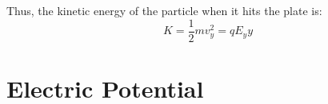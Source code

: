 Thus, the kinetic energy of the particle when it hits the plate is:
\begin{equation*}
  K = \frac{1}{2}mv_y^2 = qE_yy
\end{equation*}







\section{Electric Potential}

